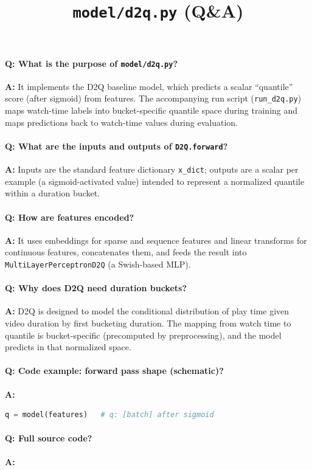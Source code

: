 \documentclass[11pt]{article}
\title{\texttt{model/d2q.py} (Q\&A)}
\author{}
\date{}
\begin{document}
\maketitle

\paragraph{Q: What is the purpose of \texttt{model/d2q.py}?}
\textbf{A:} It implements the D2Q baseline model, which predicts a scalar ``quantile'' score (after sigmoid) from features. The accompanying run script (\lstinline|run_d2q.py|) maps watch-time labels into bucket-specific quantile space during training and maps predictions back to watch-time values during evaluation.

\paragraph{Q: What are the inputs and outputs of \lstinline|D2Q.forward|?}
\textbf{A:} Inputs are the standard feature dictionary \lstinline|x_dict|; outputs are a scalar per example (a sigmoid-activated value) intended to represent a normalized quantile within a duration bucket.

\paragraph{Q: How are features encoded?}
\textbf{A:} It uses embeddings for sparse and sequence features and linear transforms for continuous features, concatenates them, and feeds the result into \lstinline|MultiLayerPerceptronD2Q| (a Swish-based MLP).

\paragraph{Q: Why does D2Q need duration buckets?}
\textbf{A:} D2Q is designed to model the conditional distribution of play time given video duration by first bucketing duration. The mapping from watch time to quantile is bucket-specific (precomputed by preprocessing), and the model predicts in that normalized space.

\paragraph{Q: Code example: forward pass shape (schematic)?}
\textbf{A:}
\begin{lstlisting}[language=Python]
q = model(features)   # q: [batch] after sigmoid
\end{lstlisting}

\paragraph{Q: Full source code?}
\textbf{A:}

\end{document}
